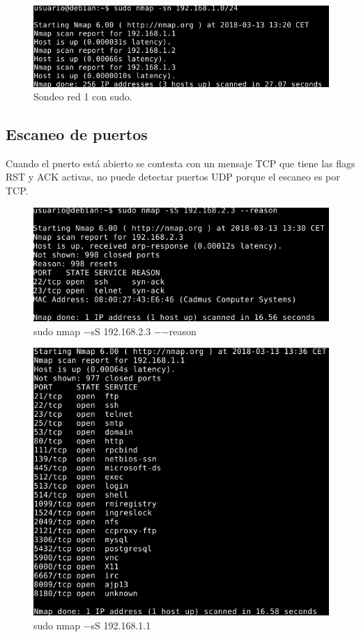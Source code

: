 \documentclass[11pt]{article}
\begin{document}
      \begin{figure}[H]
        \centering
        \includegraphics[width = \textwidth]{sondeo4}
        \caption{Sondeo red 1 con sudo.}
      \end{figure}
    \subsection{Escaneo de puertos}
      \par
      Cuando el puerto está abierto se contesta con un mensaje TCP que tiene las flags RST y ACK
      activas, no puede detectar puertos UDP porque el escaneo es por TCP.

      \begin{figure}[H]
        \centering
        \includegraphics[width = \textwidth]{sondeo5}
        \caption{sudo nmap $-$sS 192.168.2.3 $-$$-$reason}
      \end{figure}

      \begin{figure}[H]
        \centering
        \includegraphics[width = .9\textwidth]{sondeo7}
        \caption{sudo nmap $-$sS 192.168.1.1}
      \end{figure}
\end{document}
